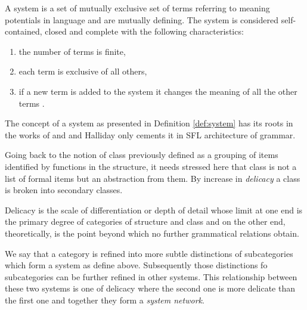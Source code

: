 \begin{definition}[System]\label{def:system}
	A system is a set of mutually exclusive set of terms referring to meaning potentials in language and are mutually defining. The system is considered self-contained, closed and complete with the following characteristics:
	\begin{enumerate}
		\item the number of terms is finite,
		\item each term is exclusive of all others,
		\item if a new term is added to the system it changes the meaning of all the other terms \citet[41]{Halliday2002}.
	\end{enumerate}
\end{definition}

The concept of a system as presented in Definition \ref{def:system} has its roots in the works of \citet{Saussure15} and \citet{Hjelmslev53} and Halliday only cements it in SFL architecture of grammar.

Going back to the notion of class previously defined as a grouping of items identified by functions in the structure, it needs stressed here that class is not a list of formal items but an abstraction from them. By increase in \textit{delicacy} a class is broken into secondary classes. 

\begin{definition}[Delicacy]\label{def:delicacy-sydney}
	Delicacy is the scale of differentiation or depth of detail whose limit at one end is the primary degree of categories of structure  and class and on the other end, theoretically, is the point beyond which no further grammatical relations obtain. \citet[58]{Halliday2002}  
\end{definition}

We say that a category is refined into more subtle distinctions of subcategories which form a system as define above. Subsequently those distinctions fo subcategories can be further refined in other systems. This relationship between these two systems is one of delicacy where the second one is more delicate than the first one and together they form a \textit{system network}.

